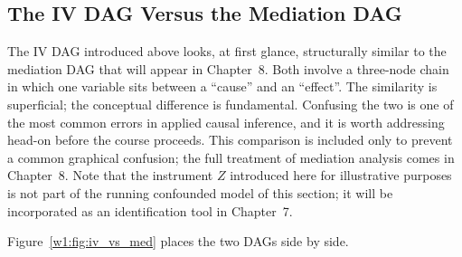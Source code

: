 \documentclass[master.tex]{subfiles}
\begin{document}
\subsection{The IV DAG Versus the Mediation DAG}
\label{w1:sec:iv_vs_med}

The IV DAG introduced above looks, at first glance, structurally similar to
the mediation DAG that will appear in Chapter~8.  Both involve a three-node
chain in which one variable sits between a ``cause'' and an ``effect''.  The
similarity is superficial; the conceptual difference is fundamental.
Confusing the two is one of the most common errors in applied causal
inference, and it is worth addressing head-on before the course proceeds.
This comparison is included only to prevent a common graphical confusion;
the full treatment of mediation analysis comes in Chapter~8.
Note that the instrument $Z$ introduced here for illustrative purposes
is not part of the running confounded model of this section; it will be
incorporated as an identification tool in Chapter~7.

Figure~\ref{w1:fig:iv_vs_med} places the two DAGs side by side.
\end{document}
